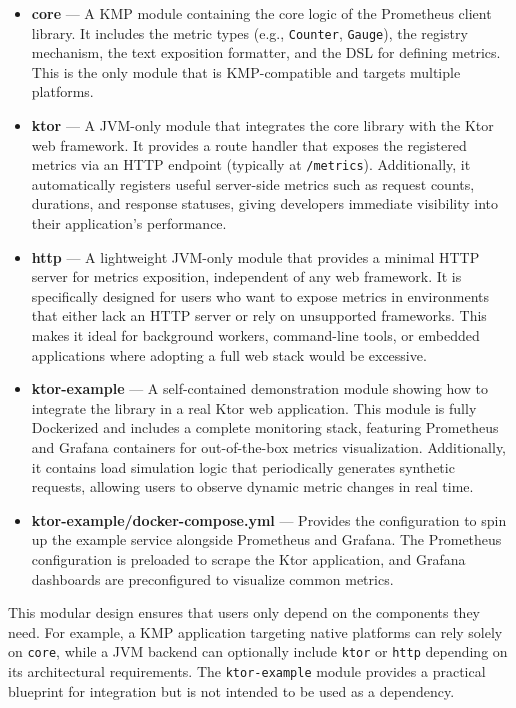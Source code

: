 \begin{itemize}
    \item \textbf{core} --- A \ac{KMP} module containing the core logic of the Prometheus client library.
    It includes the metric types (e.g., \texttt{Counter}, \texttt{Gauge}), the registry mechanism, the text
    exposition formatter, and the \ac{DSL} for defining metrics.
    This is the only module that is \ac{KMP}-compatible and targets multiple platforms.

    \item \textbf{ktor} --- A \ac{JVM}-only module that integrates the core library with the Ktor web framework.
    It provides a route handler that exposes the registered metrics via an HTTP endpoint (typically at \texttt{/metrics}). Additionally, it automatically registers useful server-side metrics such as request counts, durations, and response statuses, giving developers immediate visibility into their application's performance.

    \item \textbf{http} --- A lightweight \ac{JVM}-only module that provides a minimal HTTP server for metrics
    exposition, independent of any web framework.
    It is specifically designed for users who want to expose metrics in environments that either lack an HTTP server or rely on unsupported frameworks.
    This makes it ideal for background workers, command-line tools, or embedded applications where adopting a full web stack would be excessive.

    \item \textbf{ktor-example} --- A self-contained demonstration module showing how to integrate the library in a real Ktor web application.
    This module is fully Dockerized and includes a complete monitoring stack, featuring Prometheus and Grafana containers for out-of-the-box metrics visualization.
    Additionally, it contains load simulation logic that periodically generates synthetic requests, allowing users to observe dynamic metric changes in real time.

    \item \textbf{ktor-example/docker-compose.yml} --- Provides the configuration to spin up the example service alongside Prometheus and Grafana.
    The Prometheus configuration is preloaded to scrape the Ktor application, and Grafana dashboards are preconfigured to visualize common metrics.
\end{itemize}

This modular design ensures that users only depend on the components they need.
For example, a \ac{KMP} application targeting native platforms can rely solely on \texttt{core}, while a JVM backend
can optionally include \texttt{ktor} or \texttt{http} depending on its architectural requirements.
The \texttt{ktor-example} module provides a practical blueprint for integration but is not intended to be used as a dependency.


